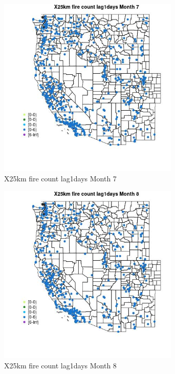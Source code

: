 \begin{figure} 
\centering  
\includegraphics[width=0.77\textwidth]{Code_Outputs/Report_ML_input_PM25_Step4_part_e_de_duplicated_aves_compiled_2019-05-14wNAs_MapObsMo7X25km_fire_count_lag1days.jpg} 
\caption{\label{fig:Report_ML_input_PM25_Step4_part_e_de_duplicated_aves_compiled_2019-05-14wNAsMapObsMo7X25km_fire_count_lag1days}X25km fire count lag1days Month 7} 
\end{figure} 
 

\clearpage 

\begin{figure} 
\centering  
\includegraphics[width=0.77\textwidth]{Code_Outputs/Report_ML_input_PM25_Step4_part_e_de_duplicated_aves_compiled_2019-05-14wNAs_MapObsMo8X25km_fire_count_lag1days.jpg} 
\caption{\label{fig:Report_ML_input_PM25_Step4_part_e_de_duplicated_aves_compiled_2019-05-14wNAsMapObsMo8X25km_fire_count_lag1days}X25km fire count lag1days Month 8} 
\end{figure} 
 

